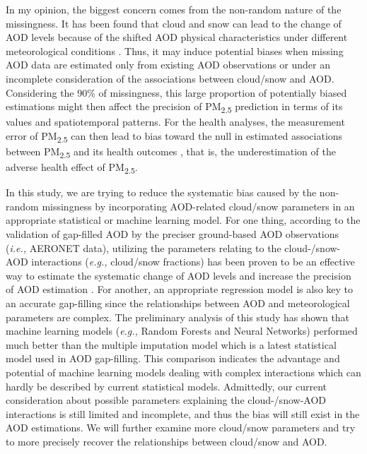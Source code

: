 \documentclass[11pt]{article}
\newcommand{\tsub}{\textsubscript}
\begin{document}
\begin{enumerate*}[{[a)]}]
    \item In my opinion, the biggest concern comes from the non-random nature of the missingness. It has been found that cloud and snow can lead to the change of AOD levels because of the shifted AOD physical characteristics under different meteorological conditions \citep{alam2014variability, kang2015correlation, emili2011high}. Thus, it may induce potential biases when missing AOD data are estimated only from existing AOD observations or under an incomplete consideration of the associations between cloud/snow and AOD. Considering the 90\% of missingness, this large proportion of potentially biased estimations might then affect the precision of PM\tsub{2.5} prediction in terms of its values and spatiotemporal patterns. For the health analyses, the measurement error of PM\tsub{2.5} can then lead to bias toward the null in estimated associations between PM\tsub{2.5} and its health outcomes \citep{sarnat2015fine}, that is, the underestimation of the adverse health effect of PM\tsub{2.5}.
    
    \item In this study, we are trying to reduce the systematic bias caused by the non-random missingness by incorporating AOD-related cloud/snow parameters in an appropriate statistical or machine learning model. For one thing, according to the validation of gap-filled AOD by the preciser ground-based AOD observations (\textit{i.e.,} AERONET data), utilizing the parameters relating to the cloud-/snow-AOD interactions (\textit{e.g.,} cloud/snow fractions) has been proven to be an effective way to estimate the systematic change of AOD levels and increase the precision of AOD estimation \citep{xiao2017full}. For another, an appropriate regression model is also key to an accurate gap-filling since the relationships between AOD and meteorological parameters are complex. The preliminary analysis of this study has shown that machine learning models (\textit{e.g.,} Random Forests and Neural Networks) performed much better than the multiple imputation model \citep{xiao2017full} which is a latest statistical model used in AOD gap-filling. This comparison indicates the advantage and potential of machine learning models dealing with complex interactions which can hardly be described by current statistical models. Admittedly, our current consideration about possible parameters explaining the cloud-/snow-AOD interactions is still limited and incomplete, and thus the bias will still exist in the AOD estimations. We will further examine more cloud/snow parameters and try to more precisely recover the relationships between cloud/snow and AOD.
\end{enumerate*}
\end{document}
